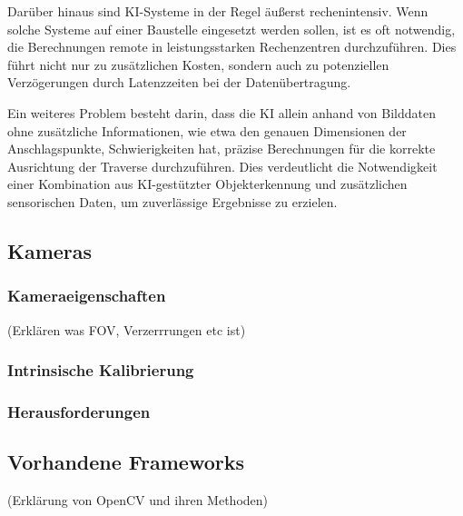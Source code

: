 Darüber hinaus sind KI-Systeme in der Regel äußerst rechenintensiv. Wenn solche Systeme auf
einer Baustelle eingesetzt werden sollen, ist es oft notwendig, die Berechnungen remote in 
leistungsstarken Rechenzentren durchzuführen. Dies führt nicht nur zu zusätzlichen Kosten, 
sondern auch zu potenziellen Verzögerungen durch Latenzzeiten bei der Datenübertragung.

Ein weiteres Problem besteht darin, dass die KI allein anhand von Bilddaten ohne zusätzliche 
Informationen, wie etwa den genauen Dimensionen der Anschlagspunkte, Schwierigkeiten hat, 
präzise Berechnungen für die korrekte Ausrichtung der Traverse durchzuführen.
Dies verdeutlicht die Notwendigkeit einer Kombination aus KI-gestützter Objekterkennung und 
zusätzlichen sensorischen Daten, um zuverlässige Ergebnisse zu erzielen.

\subsection{Kameras}
\subsubsection{Kameraeigenschaften}
(Erklären was FOV, Verzerrrungen etc ist)
\subsubsection{Intrinsische Kalibrierung}
\subsubsection{Herausforderungen}

\subsection{Vorhandene Frameworks}
(Erklärung von OpenCV und ihren Methoden)

